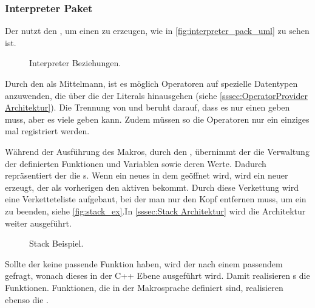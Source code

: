     \subsubsection{Interpreter Paket}
    \label{sssec:Interpreter Paket}
      Der  nutzt den , um einen  zu erzeugen, wie in \autoref{fig:interpreter_pack_uml} zu sehen ist.

      \begin{figure}[H]
        \centering
        \caption{Interpreter Beziehungen.}
        \label{fig:interpreter_pack_uml}
      \end{figure}

      Durch den  als Mittelmann, ist es möglich Operatoren auf spezielle Datentypen anzuwenden, die über die der Literals hinausgehen (siehe \autoref{sssec:OperatorProvider Architektur}). Die Trennung von  und  beruht darauf, dass es nur einen  geben muss, aber es viele  geben kann. Zudem müssen so die Operatoren nur ein einziges mal registriert werden.

      Während der Ausführung des Makros, durch den , übernimmt der  die Verwaltung der definierten Funktionen und Variablen sowie deren Werte. Dadurch repräsentiert der  die s. Wenn ein neues  in dem  geöffnet wird, wird ein neuer  erzeugt, der als vorherigen  den aktiven  bekommt. Durch diese Verkettung wird eine Verketteteliste aufgebaut, bei der man nur den Kopf entfernen muss, um ein  zu beenden, siehe \autoref{fig:stack_ex}.In \autoref{sssec:Stack Architektur} wird die Architektur weiter ausgeführt.
      \begin{figure}[H]
        \centering
        \caption{Stack Beispiel.}
        \label{fig:stack_ex}
      \end{figure}

      Sollte der  keine passende Funktion haben, wird der  nach einem passendem  gefragt, wonach dieses in der C++ Ebene ausgeführt wird. Damit realisieren s die  Funktionen. Funktionen, die in der Makrosprache definiert sind, realisieren ebenso die .

